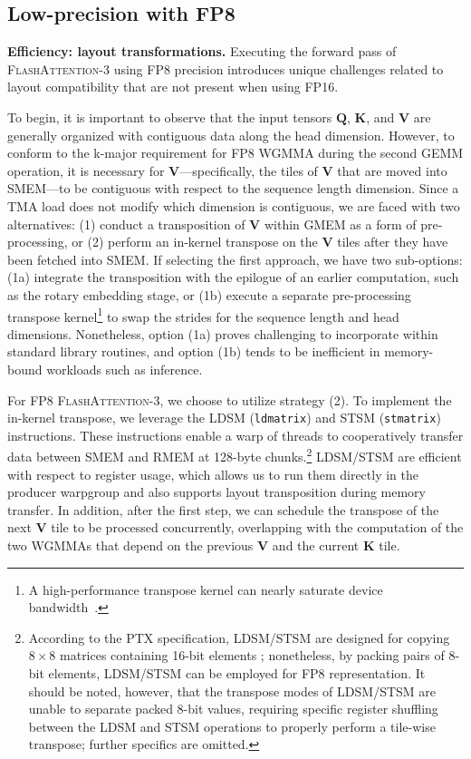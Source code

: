 \subsection{Low-precision with FP8}
\label{sec:algofp8}

\textbf{Efficiency: layout transformations.} Executing the forward pass of \textsc{FlashAttention-3} using FP8 precision introduces unique challenges related to layout compatibility that are not present when using FP16.

To begin, it is important to observe that the input tensors $\mathbf{Q}$, $\mathbf{K}$, and $\mathbf{V}$ are generally organized with contiguous data along the head dimension. However, to conform to the k-major requirement for FP8 WGMMA during the second GEMM operation, it is necessary for $\mathbf{V}$—specifically, the tiles of $\mathbf{V}$ that are moved into SMEM—to be contiguous with respect to the sequence length dimension. Since a TMA load does not modify which dimension is contiguous, we are faced with two alternatives: (1) conduct a transposition of $\mathbf{V}$ within GMEM as a form of pre-processing, or (2) perform an in-kernel transpose on the $\mathbf{V}$ tiles after they have been fetched into SMEM. If selecting the first approach, we have two sub-options: (1a) integrate the transposition with the epilogue of an earlier computation, such as the rotary embedding stage, or (1b) execute a separate pre-processing transpose kernel\footnote{A high-performance transpose kernel can nearly saturate device bandwidth~\citep{colfax_cutlass_transpose_2024}.} to swap the strides for the sequence length and head dimensions. Nonetheless, option (1a) proves challenging to incorporate within standard library routines, and option (1b) tends to be inefficient in memory-bound workloads such as inference.

For FP8 \textsc{FlashAttention-3}, we choose to utilize strategy (2). To implement the in-kernel transpose, we leverage the LDSM (\verb|ldmatrix|) and STSM (\verb|stmatrix|) instructions. These instructions enable a warp of threads to cooperatively transfer data between SMEM and RMEM at 128-byte chunks.\footnote{According to the PTX specification, LDSM/STSM are designed for copying $8 \times 8$ matrices containing 16-bit elements \cite[\S 9.7.13.4.15-16]{ptx}; nonetheless, by packing pairs of 8-bit elements, LDSM/STSM can be employed for FP8 representation. It should be noted, however, that the transpose modes of LDSM/STSM are unable to separate packed 8-bit values, requiring specific register shuffling between the LDSM and STSM operations to properly perform a tile-wise transpose; further specifics are omitted.} LDSM/STSM are efficient with respect to register usage, which allows us to run them directly in the producer warpgroup and also supports layout transposition during memory transfer. In addition, after the first step, we can schedule the transpose of the next $\mathbf{V}$ tile to be processed concurrently, overlapping with the computation of the two WGMMAs that depend on the previous $\mathbf{V}$ and the current $\mathbf{K}$ tile.

